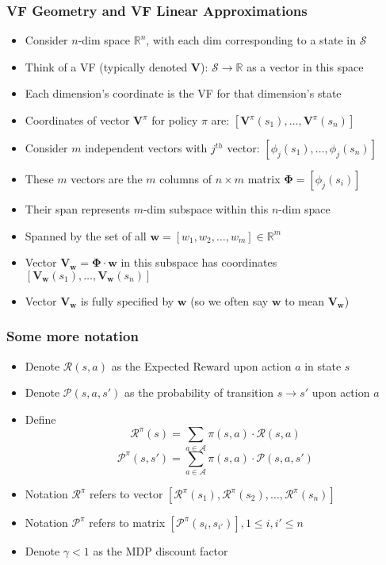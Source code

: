 \documentclass[handout]{beamer}
\newcommand{\vw}{\bm{V_w}}
\newcommand{\vpi}{\bm{V}^{\pi}}
\newcommand{\bphi}{\bm{\Phi}}
\newcommand{\bv}{\bm{V}}
\newcommand{\bw}{\bm{w}}
\newcommand{\brew}{\bm{\mathcal{R}}^{\pi}}
\newcommand{\bprob}{\bm{\mathcal{P}}^{\pi}}
\begin{document}
\begin{frame}
\frametitle{VF Geometry and VF Linear Approximations}
\pause
\begin{itemize}[<+->]
\item Consider $n$-dim space $\mathbb{R}^n$, with each dim corresponding to a state in $\mathcal{S}$
\item Think of a VF (typically denoted $\bv$): $\mathcal{S} \rightarrow \mathbb{R}$ as a vector in this space
\item Each dimension's coordinate is the VF for that dimension's state
\item Coordinates of vector $\vpi$ for policy $\pi$ are: $[\vpi(s_1), \ldots, \vpi(s_n)]$
\item Consider $m$ independent vectors with $j^{th}$ vector: $[\phi_j(s_1), \ldots, \phi_j(s_n)]$
\item These $m$ vectors are the $m$ columns of $n \times m$ matrix $\bphi = [\phi_j(s_i)]$
\item Their span represents $m$-dim subspace within this $n$-dim space
\item Spanned by the set of all $\bw = [w_1, w_2, \ldots, w_m] \in \mathbb{R}^m$
\item Vector $\vw = \bphi \cdot \bw$ in this subspace has coordinates $[\vw(s_1), \ldots , \vw(s_n)]$
\item Vector $\vw$ is fully specified by $\bw$ (so we often say $\bw$ to mean $\vw$)
\end{itemize}
\end{frame}

\begin{frame}
\frametitle{Some more notation}
\pause
\begin{itemize}[<+->]
\item Denote $\mathcal{R}(s,a)$ as the Expected Reward upon action $a$ in state $s$
\item Denote $\mathcal{P}(s,a,s')$ as the probability of transition $s \rightarrow s'$ upon action $a$
\item Define
$$\brew(s) = \sum_{a \in \mathcal{A}} \pi(s, a) \cdot \mathcal{R}(s,a)$$
$$\bprob(s,s') = \sum_{a \in \mathcal{A}} \pi(s, a) \cdot \mathcal{P}(s,a,s')$$
\item Notation $\brew$ refers to vector $[\brew(s_1), \brew(s_2), \ldots, \brew(s_n)]$
\item Notation $\bprob$ refers to matrix $[\bprob(s_i, s_{i'})], 1 \leq i, i' \leq n$ 
\item Denote $\gamma < 1$ as the MDP discount factor
\end{itemize}
\end{frame}
\end{document}
